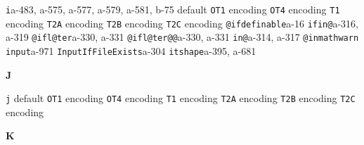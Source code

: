 \documentclass[twoside]{ltxdoc}
\makeatletter
\renewenvironment{theindex}{%
   \@restonecoltrue
   \if@twocolumn\@restonecolfalse\fi
   \columnseprule \z@
   \columnsep 35\p@
   \twocolumn[\index@prologue]%
   \IndexParms
   \let\item\@idxitem
   \ignorespaces
}{\if@restonecol\onecolumn\else\clearpage\fi}
\makeatother
\begin{document}
\begin{theindex}
  \item \texttt  {i}\pfill a-483, a-575, a-577, a-579, 
                a-581, b-75
    \subitem default\pfill {}
    \subitem \texttt  {OT1} encoding\pfill {}
    \subitem \texttt  {OT4} encoding\pfill {}
    \subitem \texttt  {T1} encoding\pfill {}
    \subitem \texttt  {T2A} encoding\pfill {}
    \subitem \texttt  {T2B} encoding\pfill {}
    \subitem \texttt  {T2C} encoding\pfill {}
  \item \texttt  {@ifdefinable}\pfill a-16
  \item \texttt  {ifin@}\pfill a-316, a-319
  \item \texttt  {@ifl@ter}\pfill a-330, a-331
  \item \texttt  {@ifl@ter@@}\pfill a-330, a-331
  \item \texttt  {in@}\pfill a-314, a-317
  \item \texttt  {@inmathwarn}\pfill {}
  \item \texttt  {input}\pfill a-971
  \item \texttt  {InputIfFileExists}\pfill a-304
  \item \texttt  {itshape}\pfill a-395, a-681

  \indexspace
{\bfseries\hfil J\hfil}\nopagebreak

  \item \texttt  {j}\efill 
    \subitem default\pfill {}
    \subitem \texttt  {OT1} encoding\pfill {}
    \subitem \texttt  {OT4} encoding\pfill {}
    \subitem \texttt  {T1} encoding\pfill {}
    \subitem \texttt  {T2A} encoding\pfill {}
    \subitem \texttt  {T2B} encoding\pfill {}
    \subitem \texttt  {T2C} encoding\pfill {}

  \indexspace
{\bfseries\hfil K\hfil}\nopagebreak


\end{theindex}
\end{document}
